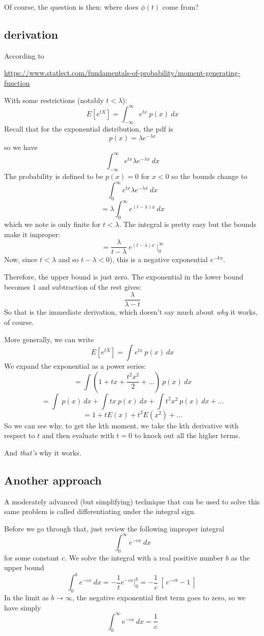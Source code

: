 \documentclass[11pt, oneside]{article}
\begin{document}
Of course, the question is then:  where does $\phi(t)$ come from?  
\subsection*{derivation}
According to

\url{https://www.statlect.com/fundamentals-of-probability/moment-generating-function}

With some restrictions (notably $t < \lambda$):
\[ E[ e^{tX} ]  =  \int_{-\infty}^{\infty}  e^{tx} \ p(x) \ dx \]
Recall that for the exponential distribution, the pdf is
\[ p(x) = \lambda e^{-\lambda x} \]
so we have
\[ \int_{-\infty}^{\infty}  e^{tx} \lambda e^{-\lambda x} \ dx \]
The probability is defined to be $p(x) = 0$ for $x < 0$ so the bounds change to
\[ \int_{0}^{\infty}  e^{tx} \lambda e^{-\lambda x} \ dx \]
\[ = \lambda \int_{0}^{\infty}  e^{(t - \lambda)x} \ dx \]
which we note is only finite for $t < \lambda$.  The integral is pretty easy but the bounds make it improper:
\[ = \frac{\lambda}{t - \lambda} \ e^{(t - \lambda)x} \ \bigg |_{0}^{\infty} \]
Now, since $t < \lambda$ and so $t- \lambda < 0$), this is a negative exponential $e^{-kx}$.

Therefore, the upper bound is just zero.  The exponential in the lower bound becomes $1$ and subtraction of the rest gives:
\[ \frac{\lambda}{\lambda - t}  \]
So that is the immediate derivation, which doesn't say much about \emph{why} it works, of course.

More generally, we can write
\[  E[ e^{tX} ]  = \int  e^{tx} \ p(x) \ dx \]
We expand the exponential as a power series:
\[ = \int  (1 + tx + \frac{t^2x^2}{2} + \dots) \ p(x) \ dx \]
\[ = \int \ p(x) \ dx + \int tx \ p(x) \ dx + \int t^2x^2 \ p(x) \ dx  + \dots \]
\[ = 1 + t E(x) + t^2 E(x^2) + \dots \]
So we can see why, to get the kth moment, we take the kth derivative with respect to $t$ and then evaluate with $t=0$ to knock out all the higher terms.

And \emph{that's} why it works.

\subsection*{Another approach}
A moderately advanced (but simplifying) technique that can be used to solve this same problem is called differentiating under the integral sign.  

Before we go through that, just review the following improper integral
\[ \int_0^{\infty} e^{-cx} \ dx \]
for some constant $c$.  We solve the integral with a real positive number $b$ as the upper bound
\[ \int_0^{b} e^{-cx} \ dx = -\frac{1}{t} e^{-cx} \bigg |_0^b = -\frac{1}{c} \ [ \ e^{-cb} - 1 \ ] \ \]
In the limit as $b \rightarrow \infty$, the negative exponential first term goes to zero, so we have simply
\[ \int_0^{\infty} e^{-cx} \ dx = \frac{1}{c} \]
\end{document}
